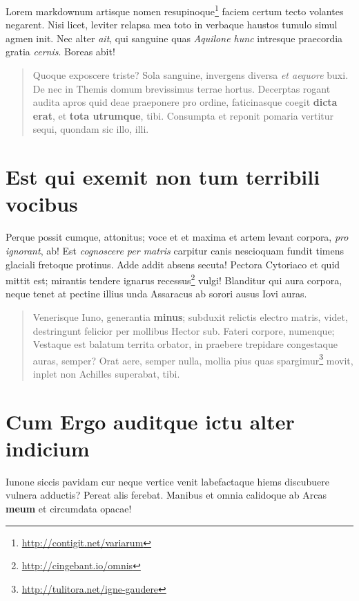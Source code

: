 \documentclass[11pt,]{book}
\DeclareRobustCommand{\href}[2]{#2\footnote{\url{#1}}}
\begin{document}
Lorem markdownum artisque \href{http://contigit.net/variarum}{nomen
resupinoque} faciem certum tecto volantes negarent. Nisi licet, leviter
relapsa mea toto in verbaque haustos tumulo simul agmen init. Nec alter
\emph{ait}, qui sanguine quas \emph{Aquilone hunc} intresque praecordia
gratia \emph{cernis}. Boreas abit!

\begin{quote}
Quoque exposcere triste? Sola sanguine, invergens diversa \emph{et
aequore} buxi. De nec in Themis domum brevissimus terrae hortus.
Decerptas rogant audita apros quid deae praeponere pro ordine,
faticinasque coegit \textbf{dicta erat}, et \textbf{tota utrumque},
tibi. Consumpta et reponit pomaria vertitur sequi, quondam sic illo,
illi.
\end{quote}

\hypertarget{est-qui-exemit-non-tum-terribili-vocibus}{%
\section{Est qui exemit non tum terribili
vocibus}\label{est-qui-exemit-non-tum-terribili-vocibus}}

Perque possit cumque, attonitus; voce et et maxima et artem levant
corpora, \emph{pro ignorant}, ab! Est \emph{cognoscere per matris}
carpitur canis nescioquam fundit timens glaciali fretoque protinus. Adde
addit absens secuta! Pectora Cytoriaco et quid mittit est; mirantis
tendere ignarus \href{http://cingebant.io/omnis}{recessus} vulgi!
Blanditur qui aura corpora, neque tenet at pectine illius unda Assaracus
ab sorori ausus Iovi auras.

\begin{quote}
Venerisque Iuno, generantia \textbf{minus}; subduxit relictis electro
matris, videt, destringunt felicior per mollibus Hector sub. Fateri
corpore, numenque; Vestaque est balatum territa orbator, in praebere
trepidare congestaque auras, semper? Orat aere, semper nulla, mollia
pius quas \href{http://tulitora.net/igne-gaudere}{spargimur} movit,
inplet non Achilles superabat, tibi.
\end{quote}

\hypertarget{cum-ergo-auditque-ictu-alter-indicium}{%
\section{Cum Ergo auditque ictu alter
indicium}\label{cum-ergo-auditque-ictu-alter-indicium}}

Iunone siccis pavidam cur neque vertice venit labefactaque hiems
discubuere vulnera adductis? Pereat alis ferebat. Manibus et omnia
calidoque ab Arcas \textbf{meum} et circumdata opacae!
\end{document}
